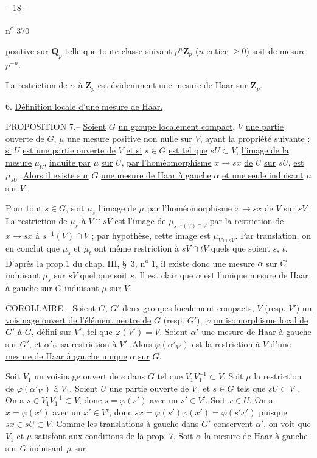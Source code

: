 \begin{center}-- 18 --\end{center}
\begin{flushright}n\textsuperscript{o} 370\end{flushright}

\uline{positive sur} $\mathbf Q_p$ \uline{telle que toute classe suivant} $p^n\mathbf Z_p$ ($n$ \uline{entier} $\geq0$) \uline{soit de mesure} $p^{-n}$.

La restriction de $\alpha$ à $\mathbf Z_p$ est évidemment une mesure de Haar sur $\mathbf Z_p$.

6. \uline{Définition locale d'une mesure de Haar.}

PROPOSITION 7.-- \uline{Soient} $G$ \uline{un groupe localement compact}, $V$ \uline{une partie ouverte de} $G$, $\mu$ \uline{une mesure positive non nulle sur} $V$, \uline{ayant la propriété suivante} : \uline{si} $U$ \uline{est une partie ouverte de} $V$ \uline{et si} $s\in G$ \uline{est tel que} $sU\subset V$, \uline{l'image de la mesure} $\mu_U$, \uline{induite par} $\mu$ \uline{sur} $U$, \uline{par l'homéomorphisme} $x\to sx$ \uline{de} $U$ \uline{sur} $sU$, \uline{est} $\mu_{sU}$. \uline{Alors il existe sur} $G$ \uline{une mesure de Haar à gauche} $\alpha$ \uline{et une seule induisant} $\mu$ \uline{sur} $V$.

Pour tout $s\in G$, soit $\mu_s$ l'image de $\mu$ par l'homéomorphisme $x\to sx$ de $V$ sur $sV$. La restriction de $\mu_s$ à $V\cap sV$ est l'image de $\mu_{s^{-1}(V)\cap V}$ par la restriction de $x\to sx$ à $s^{-1}(V)\cap V$ ; par hypothèse, cette image est $\mu_{V\cap sV}$. Par translation, on en conclut que $\mu_s$ et $\mu_t$ ont même restriction à $sV\cap tV$ quels que soient $s$, $t$. D'après la prop.1 du chap. III, \S\ 3, n\textsuperscript{o} 1, il existe donc une mesure $\alpha$ sur $G$ induisant $\mu_s$ sur $sV$ quel que soit $s$. Il est clair que $\alpha$ est l'unique mesure de Haar à gauche sur $G$ induisant $\mu$ sur $V$.

COROLLAIRE.-- \uline{Soient} $G$, $G'$ \uline{deux groupes localement compacts}, $V$ (resp. $V'$) \uline{un voisinage ouvert de l'élément neutre de} $G$ (resp. $G'$), $\varphi$ \uline{un isomorphisme local de} $G'$ \uline{à} $G$, \uline{défini sur} $V'$, \uline{tel que} $\varphi(V')=V$. \uline{Soient} $\alpha'$ \uline{une mesure de Haar à gauche sur} $G'$, \uline{et} $\alpha'_{V'}$ \uline{sa restriction à} $V'$. \uline{Alors} $\varphi(\alpha'_{V'})$ \uline{est la restriction à} $V$ \uline{d'une mesure de Haar à gauche unique} $\alpha$ \uline{sur} $G$.

Soit $V_1$ un voisinage ouvert de $e$ dans $G$ tel que $V_1V_1^{-1}\subset V$. Soit $\mu$ la restriction de $\varphi(\alpha'_{V'})$ à $V_1$. Soient $U$ une partie ouverte de $V_1$ et $s\in G$ tels que $sU\subset V_1$. On a $s\in V_1V_1^{-1}\subset V$, donc $s=\varphi(s')$ avec un $s'\in V'$. Soit $x\in U$. On a $x=\varphi(x')$ avec un $x'\in V'$, donc $sx=\varphi(s')\varphi(x')=\varphi(s'x')$ puisque $sx\in sU\subset V$. Comme les translations à gauche dans $G'$ conservent $\alpha'$, on voit que $V_1$ et $\mu$ satisfont aux conditions de la prop. 7. Soit $\alpha$ la mesure de Haar à gauche sur $G$ induisant $\mu$ sur

